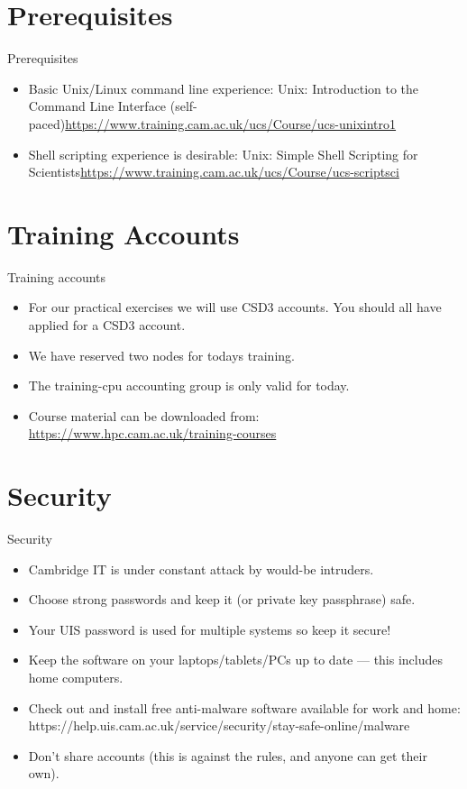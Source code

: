\section{Prerequisites}
\begin{frame}{Prerequisites}
\begin{itemize}
\item{Basic Unix/Linux command line experience:\hfill\break
\alert{Unix: Introduction to the Command Line Interface (self-paced)}\hfill\break \small\url{https://www.training.cam.ac.uk/ucs/Course/ucs-unixintro1}}
\pause
\item{Shell scripting experience is desirable:\hfill\break
\alert{Unix: Simple Shell Scripting for Scientists}\hfill\break  \small\url{https://www.training.cam.ac.uk/ucs/Course/ucs-scriptsci}}
\end{itemize}
\end{frame}

\section{Training Accounts}
\begin{frame}{Training accounts}
\begin{itemize}
\item{\alert{For our practical exercises we will use CSD3 accounts.} You should all have applied for a CSD3 account.}
\pause
\item{We have reserved two nodes for todays training.}
\pause
\item{The training-cpu accounting group is only valid for today.}
\pause
\item Course material can be downloaded from:  \url{https://www.hpc.cam.ac.uk/training-courses}
\end{itemize}
\end{frame}

\section{Security}
\begin{frame}{Security}
\begin{itemize}
\item{Cambridge IT is under constant attack by would-be intruders.}
\pause
\item{\alert{Choose strong passwords and keep it (or private key passphrase) safe.}}
\pause
\item{\alert{Your UIS password is used for multiple systems so keep it secure!}}
\pause
\item{Keep the software on your laptops/tablets/PCs up to date --- this includes home computers.}
  \pause
\item{Check out and install free anti-malware software available for work and home:\hfill
  \null\qquad\alert{\small https://help.uis.cam.ac.uk/service/security/stay-safe-online/malware}}
  \pause
\item{Don't share accounts (this is against the rules, and anyone can get their own).}
\end{itemize}
\end{frame}


